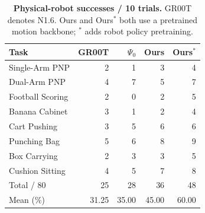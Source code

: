 \begin{table}[t]
\centering\small
\caption{\textbf{Physical-robot successes / 10 trials.} GR00T denotes N1.6. Ours and Ours$^{*}$ both use a pretrained motion backbone; $^{*}$ adds robot policy pretraining.}
\label{tab:real}
\setlength{\tabcolsep}{3.0pt}
\begin{tabular}{lrrrr}\toprule
Task & GR00T & $\Psi_0$ & Ours & Ours$^{*}$\\\midrule
Single-Arm PNP &2&1&3&4\\
Dual-Arm PNP &4&7&5&7\\
Football Scoring &2&0&2&5\\
Banana Cabinet &3&1&2&4\\
Cart Pushing &3&5&6&6\\
Punching Bag &5&6&8&9\\
Box Carrying &2&3&3&5\\
Cushion Sitting &4&5&7&8\\\midrule
Total / 80 &25&28&36&48\\
Mean (\%) &31.25&35.00&45.00&60.00\\\bottomrule
\end{tabular}
\end{table}
